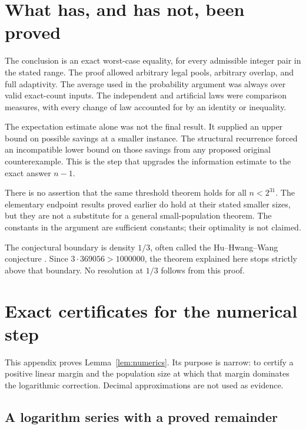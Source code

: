 \documentclass[11pt]{article}
\theoremstyle{definition}
\theoremstyle{remark}
\numberwithin{equation}{section}
\begin{document}
\section{What has, and has not, been proved}\label{sec:scope}

The conclusion is an exact worst-case equality, for every admissible
integer pair in the stated range. The proof allowed arbitrary legal
pools, arbitrary overlap, and full adaptivity. The average used in
the probability argument was always over valid exact-count inputs.
The independent and artificial laws were comparison measures, with
every change of law accounted for by an identity or inequality.

The expectation estimate alone was not the final result. It supplied
an upper bound on possible savings at a smaller instance. The
structural recurrence forced an incompatible lower bound on those
savings from any proposed original counterexample. This is the step
that upgrades the information estimate to the exact answer \(n-1\).

There is no assertion that the same threshold theorem holds for all
\(n<2^{31}\). The elementary endpoint results proved earlier do hold
at their stated smaller sizes, but they are not a substitute for a
general small-population theorem.
The constants in the argument are sufficient constants; their
optimality is not claimed.

The conjectural boundary is density \(1/3\), often called the
Hu--Hwang--Wang conjecture \cite{HHW}. Since
\(3\cdot369056>1000000\), the theorem explained here stops strictly
above that boundary. No resolution at \(1/3\) follows from this proof.

\appendix
\section{Exact certificates for the numerical step}\label{app:arithmetic}

This appendix proves Lemma~\ref{lem:numerics}. Its purpose is narrow:
to certify a positive linear margin and the population size at which
that margin dominates the logarithmic correction. Decimal
approximations are not used as evidence.

\subsection{A logarithm series with a proved remainder}
\end{document}
